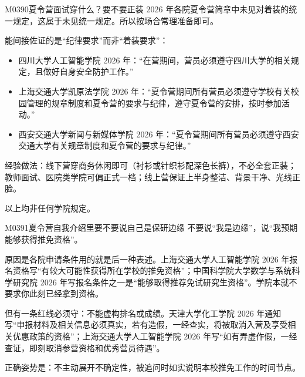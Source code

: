 \begin{qa}{M0390}{夏令营面试穿什么？要不要正装}
2026 年各院夏令营简章中未见对着装的统一规定，这属于未见统一规定。所以按场合常理准备即可。

能间接佐证的是“纪律要求”而非“着装要求”：
\begin{itemize}
  \item 四川大学人工智能学院 2026 年：“在营期间，营员必须遵守四川大学的相关规定，且做好自身安全防护工作。”
  \item 上海交通大学凯原法学院 2026 年：“夏令营期间所有营员必须遵守学校有关校园管理的规章制度和夏令营的要求与纪律，遵守夏令营的安排，按时参加活动。”
  \item 西安交通大学新闻与新媒体学院 2026 年：“夏令营期间所有营员必须遵守西安交通大学有关规章制度和夏令营的要求与纪律。”
\end{itemize}

经验做法：线下营穿商务休闲即可（衬衫或针织衫配深色长裤），不必全套正装；教师面试、医院类学院可偏正式一档；线上营保证上半身整洁、背景干净、光线正脸。

以上均非任何学院规定。
\end{qa}

\begin{qa}{M0391}{夏令营自我介绍里要不要说自己是保研边缘}
不要说“我是边缘”，说“我预期能够获得推免资格”。

原因是各院申请条件用的就是后一种表述。上海交通大学人工智能学院 2026 年报名资格写“有较大可能性获得所在学校的推免资格”；中国科学院大学数学与系统科学研究院 2026 年写报名条件之一是“能够取得推荐免试研究生资格”。学院本就不要求你此刻已经拿到资格。

但有一条红线必须守：不能虚构排名或成绩。天津大学化工学院 2026 年通知写“申报材料及相关信息必须真实，若有造假，一经查实，将被取消入营及享受相关优惠政策的资格”；上海交通大学人工智能学院 2026 年写“如有弄虚作假，一经查证，即刻取消参营资格和优秀营员待遇”。

正确姿势是：不主动展开不确定性，被追问时如实说明本校推免工作的时间节点。
\end{qa}

